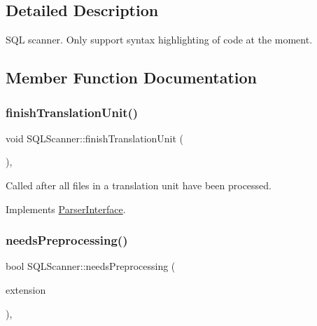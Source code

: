 \subsection{Detailed Description}
S\+QL scanner. Only support syntax highlighting of code at the moment. 

\subsection{Member Function Documentation}
\mbox{\label{class_s_q_l_scanner_a523d522ed6726915191b5a5ae9584c92}} 
\subsubsection{\texorpdfstring{finishTranslationUnit()}{finishTranslationUnit()}}
{\footnotesize\ttfamily void S\+Q\+L\+Scanner\+::finish\+Translation\+Unit (\begin{DoxyParamCaption}{ }\end{DoxyParamCaption})\hspace{0.3cm}{\ttfamily [inline]}, {\ttfamily [virtual]}}

Called after all files in a translation unit have been processed. 

Implements \mbox{\hyperlink{class_parser_interface_af3acd64c6a33852e2e46e7288eb9c9cf}{Parser\+Interface}}.

\mbox{\label{class_s_q_l_scanner_a601b62fbb52bd81bbeb991ec2540915d}} 
\subsubsection{\texorpdfstring{needsPreprocessing()}{needsPreprocessing()}}
{\footnotesize\ttfamily bool S\+Q\+L\+Scanner\+::needs\+Preprocessing (\begin{DoxyParamCaption}\item[{const \mbox{\hyperlink{class_q_c_string}{Q\+C\+String}} \&}]{extension }\end{DoxyParamCaption})\hspace{0.3cm}{\ttfamily [inline]}, {\ttfamily [virtual]}}

